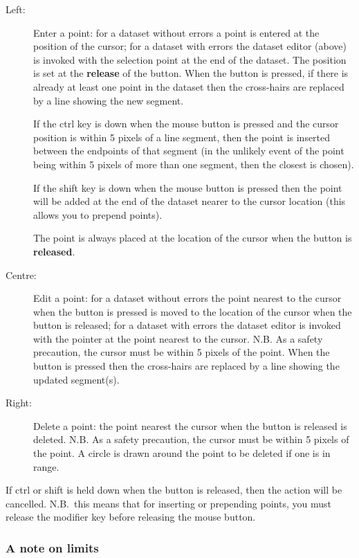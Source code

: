 \documentclass[11pt,twoside,english]{article}
\begin{document}
\begin{description}
\item [Left:]Enter a point: for a dataset without errors a point is
  entered at the position of the cursor; for a dataset with errors the
  dataset editor (above) is invoked with the selection point at the end
  of the dataset. The position is set at the \textbf{release} of the
  button. When the button is pressed, if there is already at least one
  point in the dataset then the cross-hairs are replaced by a line
  showing the new segment. 

  If the \textsf{ctrl} key is down when the mouse button is pressed and
  the cursor position is within 5 pixels of a line segment, then the
  point is inserted between the endpoints of that segment (in the
  unlikely event of the point being within 5 pixels of more than one
  segment, then the closest is chosen).

  If the \textsf{shift} key is down when the mouse button is pressed
  then the point will be added at the end of the dataset nearer to the
  cursor location (this allows you to prepend points).

  The point is always placed at the location of the cursor when the
  button is \textbf{released}.

\item [Centre:]Edit a point: for a dataset without errors the point
  nearest to the cursor when the button is pressed is moved to the
  location of the cursor when the button is released; for a dataset
  with errors the dataset editor is invoked with the pointer at the
  point nearest to the cursor. N.B. As a safety precaution, the cursor
  must be within 5 pixels of the point. When the button is pressed then
  the cross-hairs are replaced by a line showing the updated
  segment(s).
\item [Right:]Delete a point: the point nearest the cursor when the
  button is released is deleted.  N.B. As a safety precaution, the
  cursor must be within 5 pixels of the point. A circle is drawn around
  the point to be deleted if one is in range.
\end{description}
If \textsf{ctrl} or \textsf{shift} is held down when the button is
released, then the action will be cancelled. N.B.\ this means that for
inserting or prepending points, you must release the modifier key
before releasing the mouse button.

\subsubsection{A note on limits}
\end{document}
